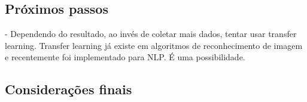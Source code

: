 \subsection{Próximos passos}
          - Dependendo do resultado, ao invés de coletar mais dados, tentar usar transfer learning. Transfer learning já existe em algoritmos de reconhecimento de imagem e recentemente foi implementado para NLP. É uma possibilidade. 
                  
\subsection{Considerações finais}

